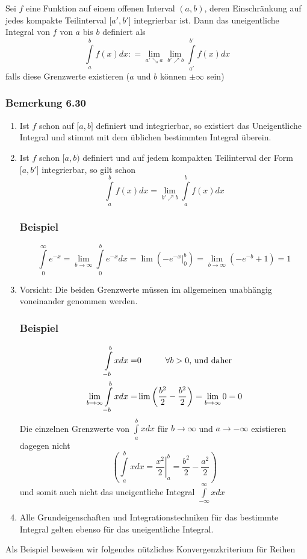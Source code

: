 \begin{definition}{6.29}
Sei $f$ eine Funktion auf einem offenen Interval $(a,b)$, deren Einschränkung auf jedes kompakte Teilinterval $\lbrack a',b'\rbrack$ integrierbar ist. Dann das uneigentliche Integral von $f$ von $a$ bis $b$ definiert als \[\int\limits_a^b {f(x)dx: = \mathop {\lim }\limits_{a' \searrow a} \mathop {\lim }\limits_{b' \nearrow b} } \int\limits_{a'}^{b'} {f(x)dx} \] falls diese Grenzwerte existieren ($a$ und $b$ können $\pm \infty$ sein)
\end{definition}

 \subsubsection*{Bemerkung 6.30}
\begin{enumerate}
\item Ist $f$ schon auf $\lbrack a,b\rbrack$ definiert und integrierbar, so existiert das Uneigentliche Integral und stimmt mit dem üblichen bestimmten Integral überein.
\item Ist $f$ schon $\lbrack a,b)$ definiert und auf jedem kompakten Teilinterval der Form $\lbrack a,b'\rbrack$ integrierbar, so gilt schon  \[\int\limits_a^b {f(x)dx = \mathop {\lim }\limits_{b' \nearrow b} } \int\limits_a^b {f(x)dx} \]
\subsubsection*{Beispiel}
\[\int\limits_0^\infty  {{e^{ - x}}}  = \mathop {\lim }\limits_{b \to \infty } \int\limits_{{0}}^b {{e^{ - x}}dx}  = \lim \left( {\left. { - {e^{ - x}}} \right|_{{0}}^b} \right) = \mathop {\lim }\limits_{b \to \infty } \left( { - {e^{ - b}} + 1} \right) = 1\]
\item Vorsicht: Die beiden Grenzwerte müssen im allgemeinen unabhängig voneinander genommen werden. 
\subsubsection*{Beispiel}

\begin{align*}
\int\limits_{ - b}^b xdx =& 0 \text{\hspace{10mm}}\forall b>0\text{, und daher}\\
\mathop {\lim }\limits_{b \to \infty } \int\limits_{ - b}^b xdx =&\lim \left( {\frac{{{b^2}}}{2} - \frac{{{b^2}}}{2}} \right) = \mathop {\lim }\limits_{b \to \infty } 0 = 0 
\end{align*}
Die einzelnen Grenzwerte von $\int\limits_a^b {xdx} $ für $b\rightarrow \infty$ und $a\rightarrow -\infty$ existieren dagegen nicht \[\left( {\int\limits_a^b {xdx = \left. {\frac{{{x^2}}}{2}} \right|_a^b = \frac{{{b^2}}}{2} - \frac{{{a^2}}}{2}} } \right)\] und somit auch nicht das uneigentliche Integral $\int\limits_{ - \infty }^\infty  {xdx} $

\item Alle Grundeigenschaften und Integrationstechniken für das bestimmte Integral gelten ebenso für das uneigentliche Integral. 
\end{enumerate}
Als Beispiel beweisen wir folgendes nützliches Konvergenzkriterium für Reihen
